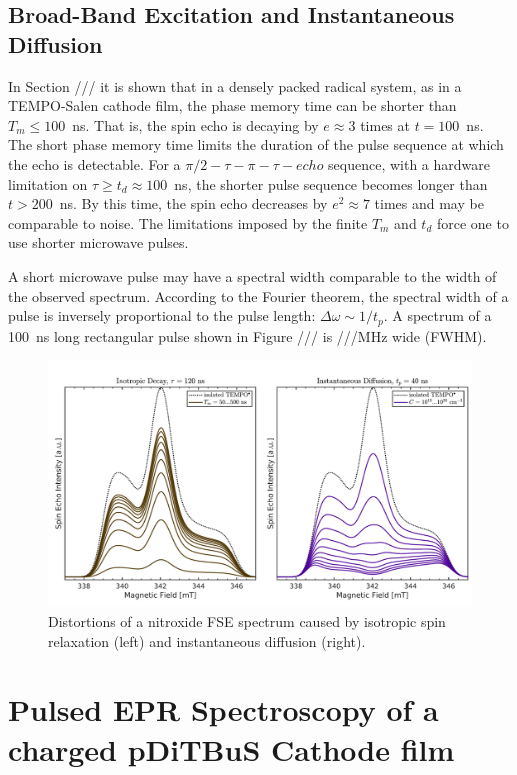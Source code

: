 \subsection{Broad-Band Excitation and Instantaneous Diffusion}
In Section /// it is shown that in a densely packed radical system, as in a TEMPO-Salen cathode film, the phase memory time can be shorter than $T_m\leq100$~ns. That is, the spin echo is decaying by $e\approx3$ times at $t=100$~ns. The short phase memory time limits the duration of the pulse sequence at which the echo is detectable. For a $\pi/2-\tau-\pi-\tau-echo$ sequence, with a hardware limitation on $\tau\geq t_d\approx100$~ns, the shorter pulse sequence becomes longer than $t>200$~ns. By this time, the spin echo decreases by $e^2\approx7$ times and may be comparable to noise. The limitations imposed by the finite $T_m$ and $t_d$ force one to use shorter microwave pulses. 
\par
A short microwave pulse may have a spectral width comparable to the width of the observed spectrum. According to the Fourier theorem, the spectral width of a pulse is inversely proportional to the pulse length: $\Delta\omega\sim 1/t_p$. A spectrum of a 100~ns long rectangular pulse shown in Figure /// is ///MHz wide (FWHM). 

\begin{figure}[h]
\center
	\includegraphics[width=1\textwidth]{./pulse/figures/FGMR/ID/ID_vs_ISO.pdf}
	\caption{Distortions of a nitroxide FSE spectrum caused by isotropic spin relaxation (left) and instantaneous diffusion (right).}
	\label{fig:iso_vs_id}
\end{figure}


\section{Pulsed EPR Spectroscopy of a charged pDiTBuS Cathode film}

